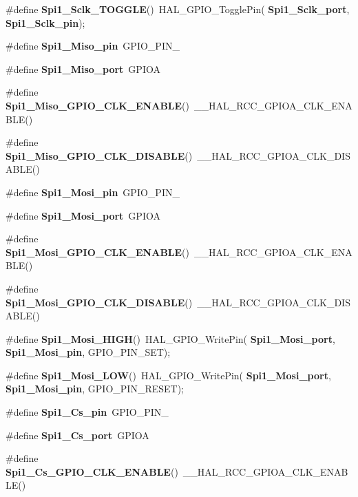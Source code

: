 \begin{DoxyCompactItemize}
\item 
\#define \textbf{ Spi1\+\_\+\+Sclk\+\_\+\+T\+O\+G\+G\+LE}()~H\+A\+L\+\_\+\+G\+P\+I\+O\+\_\+\+Toggle\+Pin(\textbf{ Spi1\+\_\+\+Sclk\+\_\+port},\textbf{ Spi1\+\_\+\+Sclk\+\_\+pin});
\item 
\#define \textbf{ Spi1\+\_\+\+Miso\+\_\+pin}~G\+P\+I\+O\+\_\+\+P\+I\+N\+\_
\item 
\#define \textbf{ Spi1\+\_\+\+Miso\+\_\+port}~G\+P\+I\+OA
\item 
\#define \textbf{ Spi1\+\_\+\+Miso\+\_\+\+G\+P\+I\+O\+\_\+\+C\+L\+K\+\_\+\+E\+N\+A\+B\+LE}()~\+\_\+\+\_\+\+H\+A\+L\+\_\+\+R\+C\+C\+\_\+\+G\+P\+I\+O\+A\+\_\+\+C\+L\+K\+\_\+\+E\+N\+A\+B\+LE()
\item 
\#define \textbf{ Spi1\+\_\+\+Miso\+\_\+\+G\+P\+I\+O\+\_\+\+C\+L\+K\+\_\+\+D\+I\+S\+A\+B\+LE}()~\+\_\+\+\_\+\+H\+A\+L\+\_\+\+R\+C\+C\+\_\+\+G\+P\+I\+O\+A\+\_\+\+C\+L\+K\+\_\+\+D\+I\+S\+A\+B\+LE()
\item 
\#define \textbf{ Spi1\+\_\+\+Mosi\+\_\+pin}~G\+P\+I\+O\+\_\+\+P\+I\+N\+\_
\item 
\#define \textbf{ Spi1\+\_\+\+Mosi\+\_\+port}~G\+P\+I\+OA
\item 
\#define \textbf{ Spi1\+\_\+\+Mosi\+\_\+\+G\+P\+I\+O\+\_\+\+C\+L\+K\+\_\+\+E\+N\+A\+B\+LE}()~\+\_\+\+\_\+\+H\+A\+L\+\_\+\+R\+C\+C\+\_\+\+G\+P\+I\+O\+A\+\_\+\+C\+L\+K\+\_\+\+E\+N\+A\+B\+LE()
\item 
\#define \textbf{ Spi1\+\_\+\+Mosi\+\_\+\+G\+P\+I\+O\+\_\+\+C\+L\+K\+\_\+\+D\+I\+S\+A\+B\+LE}()~\+\_\+\+\_\+\+H\+A\+L\+\_\+\+R\+C\+C\+\_\+\+G\+P\+I\+O\+A\+\_\+\+C\+L\+K\+\_\+\+D\+I\+S\+A\+B\+LE()
\item 
\#define \textbf{ Spi1\+\_\+\+Mosi\+\_\+\+H\+I\+GH}()~H\+A\+L\+\_\+\+G\+P\+I\+O\+\_\+\+Write\+Pin(\textbf{ Spi1\+\_\+\+Mosi\+\_\+port},\textbf{ Spi1\+\_\+\+Mosi\+\_\+pin}, G\+P\+I\+O\+\_\+\+P\+I\+N\+\_\+\+S\+ET);
\item 
\#define \textbf{ Spi1\+\_\+\+Mosi\+\_\+\+L\+OW}()~H\+A\+L\+\_\+\+G\+P\+I\+O\+\_\+\+Write\+Pin(\textbf{ Spi1\+\_\+\+Mosi\+\_\+port},\textbf{ Spi1\+\_\+\+Mosi\+\_\+pin}, G\+P\+I\+O\+\_\+\+P\+I\+N\+\_\+\+R\+E\+S\+ET);
\item 
\#define \textbf{ Spi1\+\_\+\+Cs\+\_\+pin}~G\+P\+I\+O\+\_\+\+P\+I\+N\+\_
\item 
\#define \textbf{ Spi1\+\_\+\+Cs\+\_\+port}~G\+P\+I\+OA
\item 
\#define \textbf{ Spi1\+\_\+\+Cs\+\_\+\+G\+P\+I\+O\+\_\+\+C\+L\+K\+\_\+\+E\+N\+A\+B\+LE}()~\+\_\+\+\_\+\+H\+A\+L\+\_\+\+R\+C\+C\+\_\+\+G\+P\+I\+O\+A\+\_\+\+C\+L\+K\+\_\+\+E\+N\+A\+B\+LE()

\end{DoxyCompactItemize}
